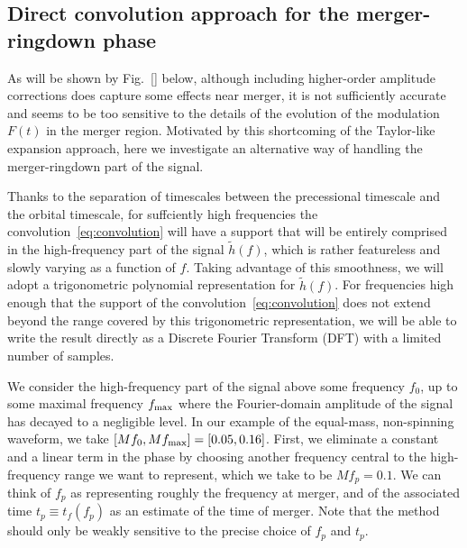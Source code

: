 \documentclass[aps,showpacs,%
prd,superscriptaddress,nofootinbib]{revtex4}
\newcommand{\tf}{t_{f}}
\begin{document}

\subsection{Direct convolution approach for the merger-ringdown phase}
\label{subsec:directconvolution}

As will be shown by Fig.~\ref{} below, although including higher-order amplitude corrections does capture some effects near merger, it is not sufficiently accurate and seems to be too sensitive to the details of the evolution of the modulation $F(t)$ in the merger region. Motivated by this shortcoming of the Taylor-like expansion approach, here we investigate an alternative way of handling the merger-ringdown part of the signal.

Thanks to the separation of timescales between the precessional timescale and the orbital timescale, for suffciently high frequencies the convolution~\eqref{eq:convolution} will have a support that will be entirely comprised in the high-frequency part of the signal $\tilde{h}(f)$, which is rather featureless and slowly varying as a function of $f$. Taking advantage of this smoothness, we will adopt a trigonometric polynomial representation for $\tilde{h}(f)$. For frequencies high enough that the support of the convolution~\eqref{eq:convolution} does not extend beyond the range covered by this trigonometric representation, we will be able to write the result directly as a Discrete Fourier Transform (DFT) with a limited number of samples.

We consider the high-frequency part of the signal above some frequency $f_{0}$, up to some maximal frequency $f_{\rm max}$ where the Fourier-domain amplitude of the signal has decayed to a negligible level. In our example of the equal-mass, non-spinning waveform, we take $[Mf_{0}, Mf_{\rm max}] = [0.05, 0.16]$. First, we eliminate a constant and a linear term in the phase by choosing another frequency central to the high-frequency range we want to represent, which we take to be $Mf_{p} = 0.1$. We can think of $f_{p}$ as representing roughly the frequency at merger, and of the associated time $t_{p}\equiv \tf(f_{p})$ as an estimate of the time of merger. Note that the method should only be weakly sensitive to the precise choice of $f_{p}$ and $t_{p}$.
\end{document}
